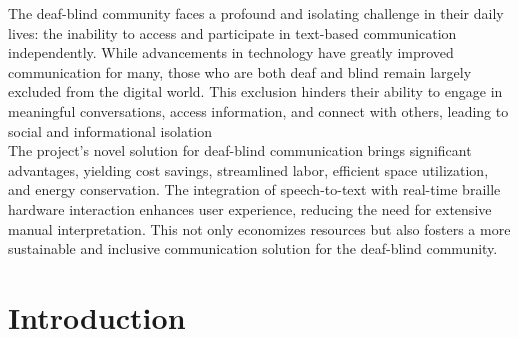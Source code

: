 \documentclass[12pt,a4paper]{report}
\begin{document}
\noindent The deaf-blind community faces a profound and isolating challenge in their daily lives: the inability to access and participate in text-based communication independently. While advancements in technology have greatly improved communication for many, those who are both deaf and blind remain largely excluded from the digital world. This exclusion hinders their ability to engage in meaningful conversations, access information, and connect with others, leading to social and informational isolation \\

\noindent The project's novel solution for deaf-blind communication brings significant advantages, yielding cost savings, streamlined labor, efficient space utilization, and energy conservation. The integration of speech-to-text with real-time braille hardware interaction enhances user experience, reducing the need for extensive manual interpretation. This not only economizes resources but also fosters a more sustainable and inclusive communication solution for the deaf-blind community.

\newpage



\renewcommand{\contentsname}{Table of Contents}
\tableofcontents
\listoffigures
{}
\listoftables
{}
\newpage

\pagestyle{fancy}
\fancyhf{}
\renewcommand{\headrulewidth}{0.5pt}
\renewcommand{\footrulewidth}{0.5pt}

\chapter{Introduction}
\par
\end{document}
